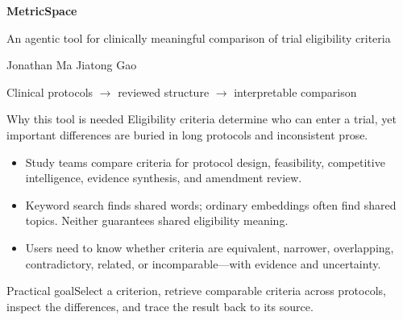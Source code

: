 \documentclass[aspectratio=169,10pt]{beamer}
\begin{document}
{\begin{frame}[plain]
\vfill{\color{white}\Huge\bfseries MetricSpace\par}\vspace{.6em}
{\Large\color{peach}An agentic tool for clinically meaningful comparison of trial eligibility criteria\par}\vspace{1.8em}
{\large\color{white}Jonathan Ma \quad\textbullet\quad Jiatong Gao\par}\vfill
{\color{peach}Clinical protocols $\rightarrow$ reviewed structure $\rightarrow$ interpretable comparison}
\end{frame}}

\begin{frame}{Why this tool is needed}
Eligibility criteria determine who can enter a trial, yet important differences are buried in long protocols and inconsistent prose.
\begin{itemize}
\item Study teams compare criteria for protocol design, feasibility, competitive intelligence, evidence synthesis, and amendment review.
\item Keyword search finds shared words; ordinary embeddings often find shared topics. Neither guarantees shared eligibility meaning.
\item Users need to know whether criteria are equivalent, narrower, overlapping, contradictory, related, or incomparable---with evidence and uncertainty.
\end{itemize}
\begin{block}{Practical goal}Select a criterion, retrieve comparable criteria across protocols, inspect the differences, and trace the result back to its source.\end{block}
\end{frame}
\end{document}

